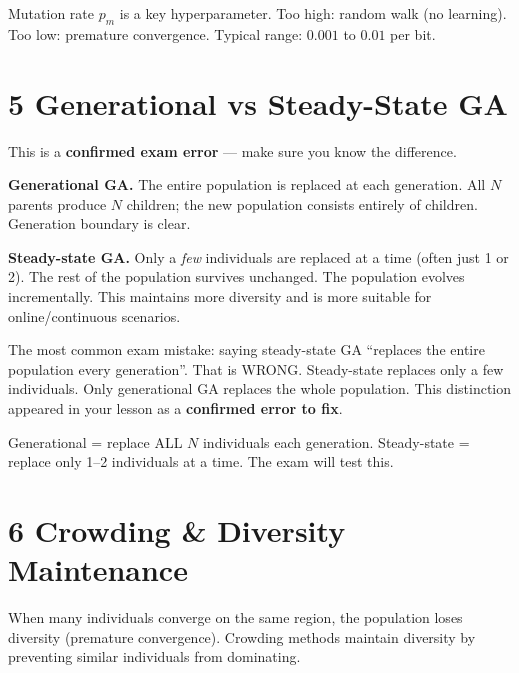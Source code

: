 \documentclass[a4paper,11pt]{article}
\begin{document}
\begin{watchout}
Mutation rate $p_m$ is a key hyperparameter. Too high: random walk (no learning). Too low: premature convergence. Typical range: $0.001$ to $0.01$ per bit.
\end{watchout}

\section{5 \quad Generational vs Steady-State GA}

This is a \textbf{confirmed exam error} — make sure you know the difference.

\textbf{Generational GA.} The entire population is replaced at each generation. All $N$ parents produce $N$ children; the new population consists entirely of children. Generation boundary is clear.

\textbf{Steady-state GA.} Only a \emph{few} individuals are replaced at a time (often just 1 or 2). The rest of the population survives unchanged. The population evolves incrementally. This maintains more diversity and is more suitable for online/continuous scenarios.

\begin{watchout}
The most common exam mistake: saying steady-state GA ``replaces the entire population every generation''. That is WRONG. Steady-state replaces only a few individuals. Only generational GA replaces the whole population. This distinction appeared in your lesson as a \textbf{confirmed error to fix}.
\end{watchout}

\begin{keytake}
Generational = replace ALL $N$ individuals each generation. Steady-state = replace only 1--2 individuals at a time. The exam will test this.
\end{keytake}

\section{6 \quad Crowding \& Diversity Maintenance}

When many individuals converge on the same region, the population loses diversity (premature convergence). Crowding methods maintain diversity by preventing similar individuals from dominating.
\end{document}
